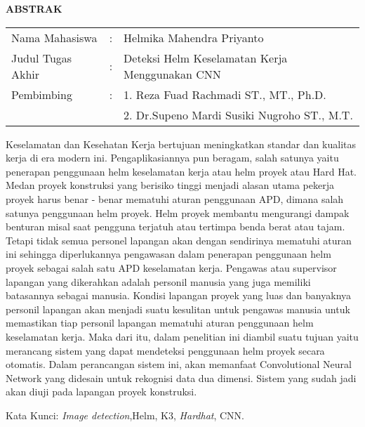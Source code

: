 \begin{center}
  \large\textbf{ABSTRAK}
\end{center}


\vspace{2ex}

\begingroup
  \setlength{\tabcolsep}{0pt}

  \noindent
  \begin{tabularx}{\textwidth}{l >{\centering}m{2em} X}
    Nama Mahasiswa    &:& Helmika Mahendra Priyanto\\

    Judul Tugas Akhir &:&	Deteksi Helm Keselamatan Kerja Menggunakan CNN \\

    Pembimbing        &:& 1. Reza Fuad Rachmadi ST., MT., Ph.D. \\
                      & & 2. Dr.Supeno Mardi Susiki Nugroho ST., M.T. \\
  \end{tabularx}
\endgroup

Keselamatan dan Kesehatan Kerja bertujuan meningkatkan standar dan kualitas kerja di era modern ini. Pengaplikasiannya pun beragam, salah satunya yaitu penerapan penggunaan helm keselamatan kerja atau helm proyek atau Hard Hat. Medan proyek konstruksi yang berisiko tinggi menjadi alasan utama pekerja proyek harus benar - benar mematuhi aturan penggunaan APD, dimana salah satunya penggunaan helm proyek. Helm proyek membantu mengurangi dampak benturan misal saat pengguna terjatuh atau tertimpa benda berat atau tajam. Tetapi tidak semua personel lapangan akan dengan sendirinya mematuhi aturan ini sehingga diperlukannya pengawasan dalam penerapan penggunaan helm proyek sebagai salah satu APD keselamatan kerja. Pengawas atau supervisor lapangan yang dikerahkan adalah personil manusia yang juga memiliki batasannya sebagai manusia. Kondisi lapangan proyek yang luas dan banyaknya personil lapangan akan menjadi suatu kesulitan untuk pengawas manusia untuk memastikan tiap personil lapangan mematuhi aturan penggunaan helm keselamatan kerja. Maka dari itu, dalam penelitian ini diambil suatu tujuan yaitu merancang sistem yang dapat mendeteksi penggunaan helm proyek secara otomatis. Dalam perancangan sistem ini, akan memanfaat Convolutional Neural Network yang didesain untuk rekognisi data dua dimensi. Sistem yang sudah jadi akan diuji pada lapangan proyek konstruksi.

Kata Kunci: \emph{Image detection},Helm, K3, \emph{Hardhat}, CNN.
